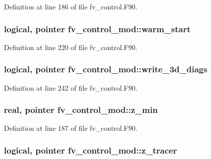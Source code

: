 Definition at line 186 of file fv\-\_\-control.\-F90.

\subsubsection[{warm\-\_\-start}]{\setlength{\rightskip}{0pt plus 5cm}logical, pointer fv\-\_\-control\-\_\-mod\-::warm\-\_\-start\hspace{0.3cm}{\ttfamily [private]}}\label{classfv__control__mod_a902561af942a30ae404d58555bcf849c}


Definition at line 220 of file fv\-\_\-control.\-F90.

\subsubsection[{write\-\_\-3d\-\_\-diags}]{\setlength{\rightskip}{0pt plus 5cm}logical, pointer fv\-\_\-control\-\_\-mod\-::write\-\_\-3d\-\_\-diags\hspace{0.3cm}{\ttfamily [private]}}\label{classfv__control__mod_abdedb56658d66d52ddd0462ddf5438fd}


Definition at line 242 of file fv\-\_\-control.\-F90.

\subsubsection[{z\-\_\-min}]{\setlength{\rightskip}{0pt plus 5cm}real, pointer fv\-\_\-control\-\_\-mod\-::z\-\_\-min\hspace{0.3cm}{\ttfamily [private]}}\label{classfv__control__mod_a65816317cf5d1265356c6373d64deecf}


Definition at line 187 of file fv\-\_\-control.\-F90.

\subsubsection[{z\-\_\-tracer}]{\setlength{\rightskip}{0pt plus 5cm}logical, pointer fv\-\_\-control\-\_\-mod\-::z\-\_\-tracer\hspace{0.3cm}{\ttfamily [private]}}\label{classfv__control__mod_af47884ffb9df2d7a1ef46cad26ef3c14}


